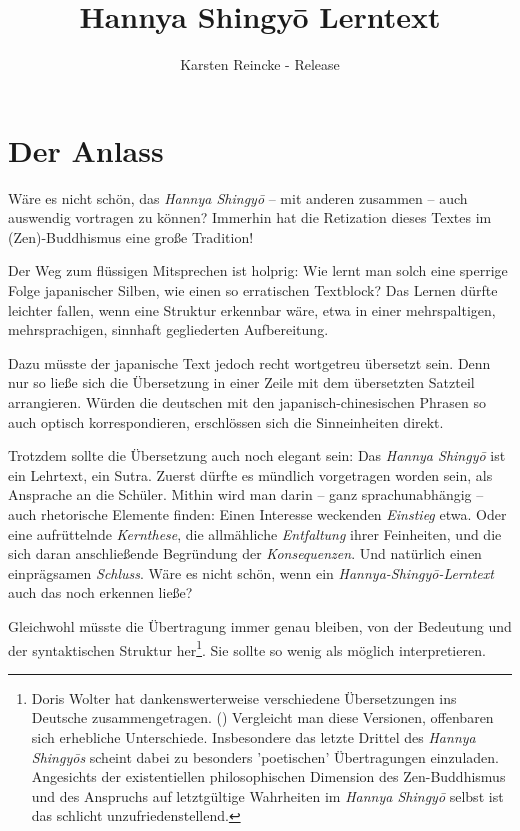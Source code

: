 \documentclass[
DIV=calc,
BCOR=5mm,
11pt,
headings=small,
oneside,
bibtotocnumbered]{scrartcl}
\begin{document}

\nocite{*}

\titlehead{Mit Dank an meine Frau für ihren wunderbaren Mut zu neuen guten
Wegen:}
\title{Hannya Shingyō Lerntext}
\author{Karsten Reincke 
 - Release  }

\maketitle
\section{Der Anlass}
 
Wäre es nicht schön, das \emph{Hannya Shingyō} -- mit anderen zusammen -- auch
auswendig vortragen zu können? Immerhin hat die Retization dieses Textes im
(Zen)-Buddhismus eine große Tradition!

Der Weg zum flüssigen Mitsprechen ist holprig: Wie lernt man solch eine sperrige
Folge japanischer Silben, wie einen so erratischen Textblock? Das Lernen dürfte
leichter fallen, wenn eine Struktur erkennbar wäre, etwa in einer
mehrspaltigen, mehrsprachigen, sinnhaft gegliederten Aufbereitung.

Dazu müsste der japanische Text jedoch recht wortgetreu übersetzt sein.
Denn nur so ließe sich die Übersetzung in einer Zeile mit dem übersetzten
Satzteil arrangieren. Würden die deutschen mit den japanisch-chinesischen
Phrasen so auch optisch korrespondieren, erschlössen sich die
Sinneinheiten direkt.

Trotzdem sollte die Übersetzung auch noch elegant sein: Das \emph{Hannya
Shingyō} ist ein Lehrtext, ein Sutra. Zuerst dürfte es mündlich vorgetragen
worden sein, als Ansprache an die Schüler. Mithin wird man darin -- ganz
sprachunabhängig -- auch rhetorische Elemente finden: Einen Interesse weckenden
\emph{Einstieg} etwa. Oder eine aufrüttelnde \emph{Kernthese}, die allmähliche
\emph{Entfaltung} ihrer Feinheiten, und die sich daran anschließende Begründung
der \emph{Konsequenzen}. Und natürlich einen einprägsamen \emph{Schluss}. Wäre es
nicht schön, wenn ein \emph{Hannya-Shingyō-Lerntext} auch das noch erkennen
ließe?

Gleichwohl müsste die Übertragung immer genau bleiben, von der Bedeutung und der
syntaktischen Struktur her\footnote{Doris Wolter hat dankenswerterweise
verschiedene Übersetzungen ins Deutsche zusammengetragen.
(\cite[vgl.][\nopage]{Wolter2010a}) Vergleicht man diese Versionen, offenbaren
sich erhebliche Unterschiede. Insbesondere das letzte Drittel des \emph{Hannya
Shingyōs} scheint dabei zu besonders 'poetischen' Übertragungen einzuladen.
Angesichts der existentiellen philosophischen Dimension des Zen-Buddhismus und
des Anspruchs auf letztgültige Wahrheiten im \emph{Hannya Shingyō} selbst ist
das schlicht unzufriedenstellend.}. Sie sollte so wenig als möglich
interpretieren.
\end{document}
